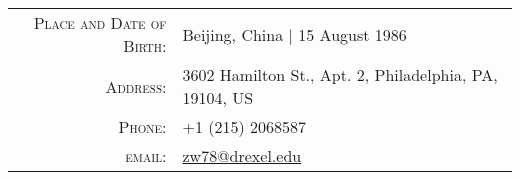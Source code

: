 \iffinal{}{\newpage}

\begin{vita}

\singlespacing

{\Large\scshape{}}
\newline
\begin{tabular}{rl}
    \textsc{Place and Date of Birth:} & Beijing, China  | 15 August 1986 \\
    \textsc{Address:}   & 3602 Hamilton St., Apt. 2, Philadelphia, PA, 19104, US \\
    \textsc{Phone:}     & +1 (215) 2068587\\
    \textsc{email:}     & \href{mailto:zw78@drexel.edu}{zw78@drexel.edu}
\end{tabular}


\end{vita}
